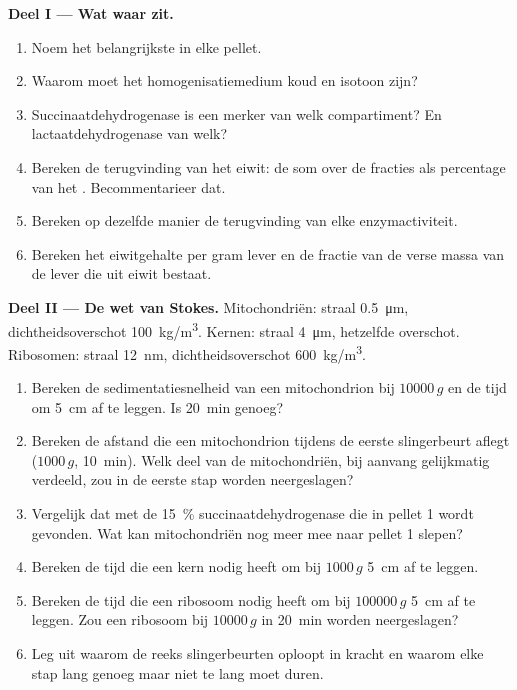 \begin{problem}
\medskip
\noindent\textbf{Deel I --- Wat waar zit.}
\begin{enumerate}
  \item Noem het belangrijkste  in elke pellet.
  \item Waarom moet het homogenisatiemedium koud en isotoon zijn?
  \item Succinaatdehydrogenase is een merker van welk compartiment? En
        lactaatdehydrogenase van welk?
  \item Bereken de terugvinding van het eiwit: de som over de fracties als
        percentage van het . Becommentarieer dat.
  \item Bereken op dezelfde manier de terugvinding van elke
        enzymactiviteit.
  \item Bereken het eiwitgehalte per gram lever en de fractie van de verse
        massa van de lever die uit eiwit bestaat.
\end{enumerate}

\medskip
\noindent\textbf{Deel II --- De wet van Stokes.}
Mitochondriën: straal \qty{0.5}{\micro m}, dichtheidsoverschot
\qty{100}{kg/m^3}. Kernen: straal \qty{4}{\micro m}, hetzelfde overschot.
Ribosomen: straal \qty{12}{nm}, dichtheidsoverschot \qty{600}{kg/m^3}.
\begin{enumerate}[resume]
  \item Bereken de sedimentatiesnelheid van een mitochondrion bij
        $\num{10000}\,g$ en de tijd om \qty{5}{cm} af te leggen. Is
        \qty{20}{min} genoeg?
  \item Bereken de afstand die een mitochondrion tijdens de eerste
        slingerbeurt aflegt ($1000\,g$, \qty{10}{min}). Welk deel van de
        mitochondriën, bij aanvang gelijkmatig verdeeld, zou in de eerste
        stap worden neergeslagen?
  \item Vergelijk dat met de \qty{15}{\%} succinaatdehydrogenase die in
        pellet 1 wordt gevonden. Wat kan mitochondriën nog meer mee naar
        pellet 1 slepen?
  \item Bereken de tijd die een kern nodig heeft om bij $1000\,g$
        \qty{5}{cm} af te leggen.
  \item Bereken de tijd die een ribosoom nodig heeft om bij
        $\num{100000}\,g$ \qty{5}{cm} af te leggen. Zou een ribosoom bij
        $\num{10000}\,g$ in \qty{20}{min} worden neergeslagen?
  \item Leg uit waarom de reeks slingerbeurten oploopt in kracht en
        waarom elke stap lang genoeg maar niet te lang moet duren.
\end{enumerate}


\end{problem}

